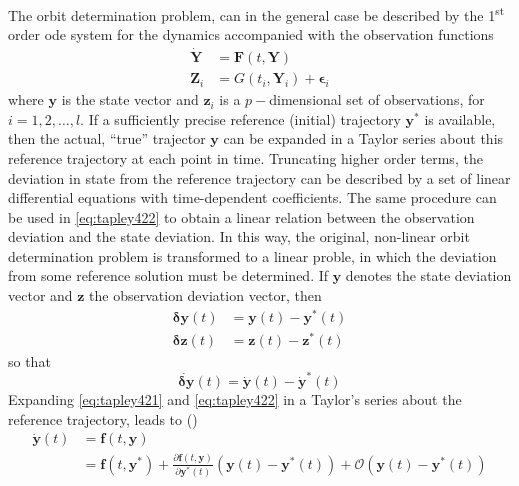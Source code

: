 The orbit determination problem, can in the general case be described by the 
1\textsuperscript{st} order \gls{ode} system for the dynamics accompanied with 
the observation functions
\begin{align}
  \bm{\dot{Y}} &= \bm{F}(t, \bm{Y}) \label{eq:tapley421} \\
  \bm{Z}_i     &=  G(t_i, \bm{Y}_i) + \bm{\epsilon}_i \label{eq:tapley422}
\end{align}
where $\bm{y}$ is the state vector and $\bm{z}_i$ is a $p-$dimensional set of 
observations, for $i=1,2,\dots ,l$. If a sufficiently precise reference (initial) 
trajectory $\bm{y}^{*}$ is available, then the actual, ``true'' trajector $\bm{y}$ 
can be expanded in a Taylor series about this reference trajectory at each point 
in time. Truncating higher order terms, the deviation in state from the 
reference trajectory can be described by a set of linear differential equations 
with time-dependent coefficients. The same procedure can be used in \autoref{eq:tapley422} 
to obtain a linear relation between the observation deviation and the state deviation.
In this way, the original, non-linear orbit determination problem is transformed 
to a linear proble, in which the deviation from some reference solution must be 
determined.
If $\bm{y}$ denotes the state deviation vector and $\bm{z}$ the observation deviation 
vector, then
\begin{equation}
  \begin{aligned}
    \bm{\delta y}(t) &= \bm{y}(t) - \bm{y}^{*}(t) \\
    \bm{\delta z}(t) &= \bm{z}(t) - \bm{z}^{*}(t)
  \end{aligned}
\end{equation}
so that
\begin{equation}\label{eq:tapley424}
  \dot{\bm{\delta y}}(t) = \dot{\bm{y}}(t) - \dot{\bm{y}}^{*}(t)
\end{equation}
Expanding \autoref{eq:tapley421} and \autoref{eq:tapley422} in a Taylor's series 
about the reference trajectory, leads to (\cite{Tapley2004})
\begin{equation}\label{eq:tapley425a}
  \begin{aligned}
  \bm{\dot{y}}(t) &= \bm{f}(t, \bm{y}) \\
                  &= \bm{f}(t, \bm{y}^{*}) + 
                  \frac{\partial \bm{f}(t, \bm{y})}{\partial \bm{y}^{*}(t)} 
                  \left( \bm{y}(t) - \bm{y}^{*}(t) \right) 
                  + \mathcal{O}\left( \bm{y}(t) - \bm{y}^{*}(t) \right)
  \end{aligned}
\end{equation}
